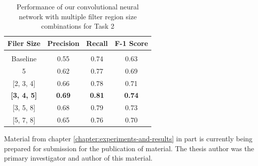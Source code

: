 \begin{table}[ht]
    \centering
    \caption{Performance of our convolutional neural network with multiple filter region size combinations for Task 2}
    \begin{tabular}{c  c  c  c}
         \toprule
         \textbf{Filer Size}        &   \textbf{Precision}      &   \textbf{Recall}            &   \textbf{F-1 Score}      \\
         \midrule
         \\[-1em]
         
         Baseline                   &   0.55                    &            0.74                       &   0.63                    \\

         5                          &   0.62                    &             0.77                       &   0.69                    \\
         
         [2, 3, 4]                  &   0.66                    &             0.78                       &   0.71                    \\

         \textbf{[3, 4, 5]}         &   \textbf{0.69}           &             \textbf{0.81}              &   \textbf{0.74}           \\

         [3, 5, 8]                  &   0.68                    &             0.79                       &   0.73                    \\
         
         [5, 7, 8]                  &   0.65                     &            0.76                       &   0.70                    \\
         
         \bottomrule
    \end{tabular}
    \label{table:task2-multiple-filter-results}
\end{table}

Material from chapter \ref{chapter:experiments-and-results} in part is currently being prepared for submission for the publication of material. The thesis author was the primary investigator and author of this material. 
